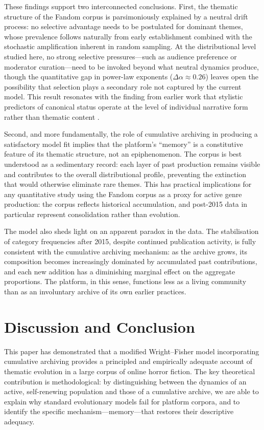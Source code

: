 \documentclass{anthology-ch}         %
\begin{document}
These findings support two interconnected conclusions. First, the thematic structure of the Fandom corpus is parsimoniously explained by a neutral drift process: no selective advantage needs to be postulated for dominant themes, whose prevalence follows naturally from early establishment combined with the stochastic amplification inherent in random sampling. At the distributional level studied here, no strong selective pressures---such as audience preference or moderator curation---need to be invoked beyond what neutral dynamics produce, though the quantitative gap in power-law exponents ($\Delta\alpha \approx 0.26$) leaves open the possibility that selection plays a secondary role not captured by the current model. This result resonates with the finding from earlier work that stylistic predictors of canonical status operate at the level of individual narrative form rather than thematic content \cite{lionnet2025makes}.

Second, and more fundamentally, the role of cumulative archiving in producing a satisfactory model fit implies that the platform's ``memory'' is a constitutive feature of its thematic structure, not an epiphenomenon. The corpus is best understood as a sedimentary record: each layer of past production remains visible and contributes to the overall distributional profile, preventing the extinction that would otherwise eliminate rare themes. This has practical implications for any quantitative study using the Fandom corpus as a proxy for active genre production: the corpus reflects historical accumulation, and post-2015 data in particular represent consolidation rather than evolution.

The model also sheds light on an apparent paradox in the data. The stabilisation of category frequencies after 2015, despite continued publication activity, is fully consistent with the cumulative archiving mechanism: as the archive grows, its composition becomes increasingly dominated by accumulated past contributions, and each new addition has a diminishing marginal effect on the aggregate proportions. The platform, in this sense, functions less as a living community than as an involuntary archive of its own earlier practices.

\section{Discussion and Conclusion}

This paper has demonstrated that a modified Wright--Fisher model incorporating cumulative archiving provides a principled and empirically adequate account of thematic evolution in a large corpus of online horror fiction. The key theoretical contribution is methodological: by distinguishing between the dynamics of an active, self-renewing population and those of a cumulative archive, we are able to explain why standard evolutionary models fail for platform corpora, and to identify the specific mechanism---memory---that restores their descriptive adequacy.
\end{document}
